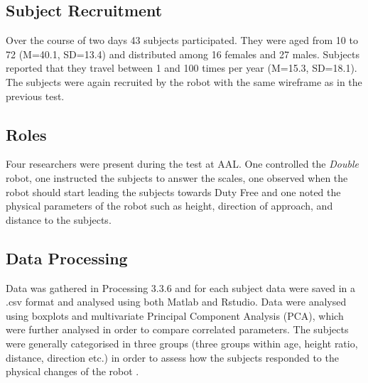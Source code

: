 \subsection{Subject Recruitment}
Over the course of two days 43 subjects participated. They were aged from 10 to 72 (M=40.1, SD=13.4) and distributed among 16 females and 27 males. Subjects reported that they travel between 1 and 100 times per year (M=15.3, SD=18.1). The subjects were again recruited by the robot with the same wireframe as in the previous test.

\subsection{Roles}
Four researchers were present during the test at AAL. One controlled the \textit{Double} robot, one instructed the subjects to answer the scales, one observed when the robot should start leading the subjects towards Duty Free and one noted the physical parameters of the robot such as height, direction of approach, and distance to the subjects.

\subsection{Data Processing}
Data was gathered in Processing 3.3.6 and for each subject data were saved in a .csv format and analysed using both Matlab and Rstudio. Data were analysed using boxplots and multivariate Principal Component Analysis (PCA), which were further analysed in order to compare correlated parameters. The subjects were generally categorised in three groups (three groups within age, height ratio, distance, direction etc.) in order to assess how the subjects responded to the physical changes of the robot .
